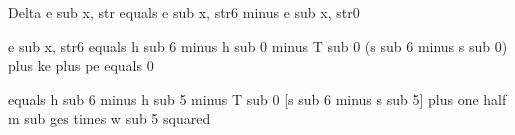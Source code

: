 Delta e sub x, str equals e sub x, str6 minus e sub x, str0

e sub x, str6 equals h sub 6 minus h sub 0 minus T sub 0 (s sub 6 minus s sub 0) plus ke plus pe equals 0

equals h sub 6 minus h sub 5 minus T sub 0 [s sub 6 minus s sub 5] plus one half m sub ges times w sub 5 squared